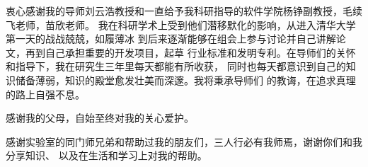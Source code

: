\begin{acknowledgement}
  衷心感谢我的导师刘云浩教授和一直给予我科研指导的软件学院杨铮副教授，毛续飞老师，苗欣老师。
  我在科研学术上受到他们潜移默化的影响，从进入清华大学第一天的战战兢兢，如履薄冰
  到后来逐渐能够在组会上参与讨论并自己讲解论文，再到自己承担重要的开发项目，起草
  行业标准和发明专利。在导师们的关怀和指导下，我在研究生三年里每天都能有所收获，
  同时也每天都意识到自己的知识储备薄弱，知识的殿堂愈发壮美而深邃。我将秉承导师们
  的教诲，在追求真理的路上自强不息。

  感谢我的父母，自始至终对我的关心爱护。

  感谢实验室的同门师兄弟和帮助过我的朋友们，三人行必有我师焉，谢谢你们和我分享知识、
  以及在生活和学习上对我的帮助。
\end{acknowledgement}
